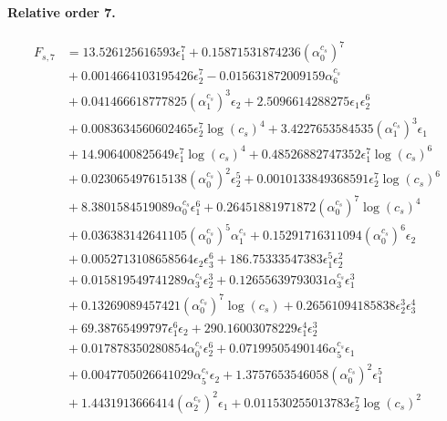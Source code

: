 \documentclass[10pt]{article}
\begin{document}
\paragraph{Relative order 7.}
\begin{align*}
F_{s,7} &= 13.526125616593 \epsilon_{1}^{7} + 0.15871531874236 \left(\alpha_{0}^{c_s}\right)^{7} \\
&{}  + 0.0014664103195426 \epsilon_{2}^{7} - 0.015631872009159 \alpha_{6}^{c_s} \\
&{}  + 0.041466618777825 \left(\alpha_{1}^{c_s}\right)^{3} \epsilon_{2} + 2.5096614288275 \epsilon_{1} \epsilon_{2}^{6} \\
&{}  + 0.0083634560602465 \epsilon_{2}^{7} \log{\left(c_{s} \right)}^{4} + 3.4227653584535 \left(\alpha_{1}^{c_s}\right)^{3} \epsilon_{1} \\
&{}  + 14.906400825649 \epsilon_{1}^{7} \log{\left(c_{s} \right)}^{4} + 0.48526882747352 \epsilon_{1}^{7} \log{\left(c_{s} \right)}^{6} \\
&{}  + 0.023065497615138 \left(\alpha_{0}^{c_s}\right)^{2} \epsilon_{2}^{5} + 0.0010133849368591 \epsilon_{2}^{7} \log{\left(c_{s} \right)}^{6} \\
&{}  + 8.3801584519089 \alpha_{0}^{c_s} \epsilon_{1}^{6} + 0.26451881971872 \left(\alpha_{0}^{c_s}\right)^{7} \log{\left(c_{s} \right)}^{4} \\
&{}  + 0.036383142641105 \left(\alpha_{0}^{c_s}\right)^{5} \alpha_{1}^{c_s} + 0.15291716311094 \left(\alpha_{0}^{c_s}\right)^{6} \epsilon_{2} \\
&{}  + 0.0052713108658564 \epsilon_{2} \epsilon_{3}^{6} + 186.75333547383 \epsilon_{1}^{5} \epsilon_{2}^{2} \\
&{}  + 0.015819549741289 \alpha_{3}^{c_s} \epsilon_{2}^{3} + 0.12655639793031 \alpha_{3}^{c_s} \epsilon_{1}^{3} \\
&{}  + 0.13269089457421 \left(\alpha_{0}^{c_s}\right)^{7} \log{\left(c_{s} \right)} + 0.26561094185838 \epsilon_{2}^{3} \epsilon_{3}^{4} \\
&{}  + 69.38765499797 \epsilon_{1}^{6} \epsilon_{2} + 290.16003078229 \epsilon_{1}^{4} \epsilon_{2}^{3} \\
&{}  + 0.017878350280854 \alpha_{0}^{c_s} \epsilon_{2}^{6} + 0.07199505490146 \alpha_{5}^{c_s} \epsilon_{1} \\
&{}  + 0.0047705026641029 \alpha_{5}^{c_s} \epsilon_{2} + 1.3757653546058 \left(\alpha_{0}^{c_s}\right)^{2} \epsilon_{1}^{5} \\
&{}  + 1.4431913666414 \left(\alpha_{2}^{c_s}\right)^{2} \epsilon_{1} + 0.011530255013783 \epsilon_{2}^{7} \log{\left(c_{s} \right)}^{2} \\

\end{align*}
\end{document}
